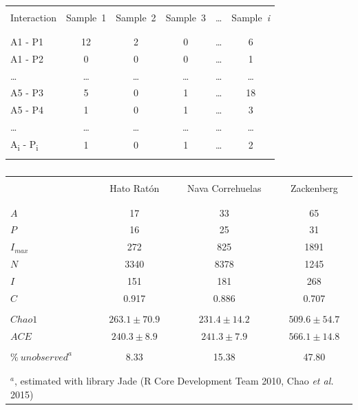 \documentclass[12pt]{article}
\begin{document}
%
\newpage
\begin{table}[ht!]
  \caption{}
  \label{Table_3}
  \begin{center}
    \begin{tabular}{lccccc}
      \hline
\\Interaction&Sample\ 1&Sample\ 2&Sample\ 3&{\ldots}&Sample\ \emph{i}\\\\
      \hline
\\A1 - P1&12&2&0&{\ldots}&6\\
A1 - P2&0&0&0&{\ldots}&1\\
{\ldots}&{\ldots}&{\ldots}&{\ldots}&{\ldots}&{\ldots}\\
A5 - P3&5&0&1&{\ldots}&18\\
A5 - P4&1&0&1&{\ldots}&3\\
{\ldots}&{\ldots}&{\ldots}&{\ldots}&{\ldots}&{\ldots}\\
A\textsubscript{i} - P\textsubscript{i}&1&0&1&{\ldots}&2\\\\
      \hline
    \end{tabular}
  \end{center}
\end{table}
%
\newpage
\begin{table}[ht!]
  \caption{}
  \label{Table_4}
  \begin{center}
    \begin{tabular}{lccc}
      \hline
\\       &Hato Rat\'on  &  Nava Correhuelas&    Zackenberg\\\\
      \hline             
\\$A$&17&33&65\\
$P$&16&25&31\\
$I_{max}$&272&825&1891\\
$N$&3340&8378&1245\\
$I$&151&181&268\\
$C$&0.917&0.886&0.707\\\\
$Chao1$&$263.1\pm70.9$&$231.4\pm14.2$&$509.6\pm54.7$\\
$ACE$&$240.3\pm8.9$&$241.3\pm7.9$&$566.1\pm14.8$\\\\
$\%\ unobserved^a$&8.33&15.38&47.80\\\\
      \hline
\\\multicolumn{4}{l}{$^a$, estimated with library Jade (R Core Development Team 2010, Chao \emph{et al.} 2015)}\\
    \end{tabular}
  \end{center}
\end{table}
\end{document}
